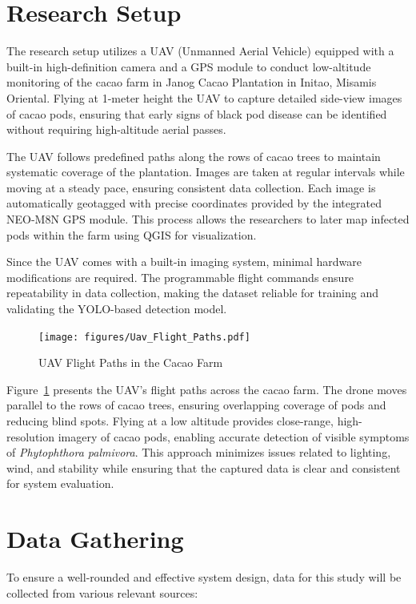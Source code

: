 \section{Research Setup}

The research setup utilizes a UAV (Unmanned Aerial Vehicle) equipped with a built-in high-definition camera and a GPS module to conduct low-altitude monitoring of the cacao farm in Janog Cacao Plantation in Initao, Misamis Oriental. 
Flying at 1-meter height the UAV to capture detailed side-view images of cacao pods, ensuring that early signs of black pod disease can be identified without requiring high-altitude aerial passes.

The UAV follows predefined paths along the rows of cacao trees to maintain systematic coverage of the plantation. 
Images are taken at regular intervals while moving at a steady pace, ensuring consistent data collection. 
Each image is automatically geotagged with precise coordinates provided by the integrated NEO-M8N GPS module. 
This process allows the researchers to later map infected pods within the farm using QGIS for visualization.

Since the UAV comes with a built-in imaging system, minimal hardware modifications are required. 
The programmable flight commands ensure repeatability in data collection, making the dataset reliable for training and validating the YOLO-based detection model.

\begin{figure}[H]
	\centering
	\caption{UAV Flight Paths in the Cacao Farm}
	\label{fig:uav_flight_paths}
	\texttt{[image: figures/Uav\_Flight\_Paths.pdf]}
\end{figure}

Figure~\ref{fig:uav_flight_paths} presents the UAV’s flight paths across the cacao farm. 
The drone moves parallel to the rows of cacao trees, ensuring overlapping coverage of pods and reducing blind spots. 
Flying at a low altitude provides close-range, high-resolution imagery of cacao pods, enabling accurate detection of visible symptoms of \textit{Phytophthora palmivora}. 
This approach minimizes issues related to lighting, wind, and stability while ensuring that the captured data is clear and consistent for system evaluation.


\section{Data Gathering}
To ensure a well-rounded and effective system design, data for this study will be collected from various relevant sources:

